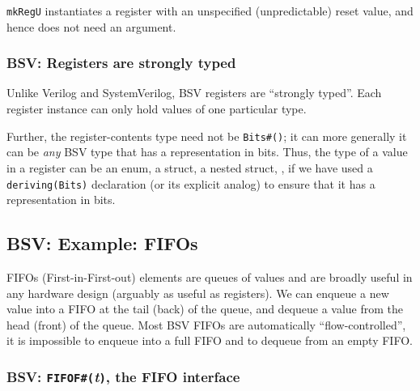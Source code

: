 \verb|mkRegU| instantiates a register with an unspecified
(unpredictable) reset value, and hence does not need an argument.


\subsubsection{BSV: Registers are strongly typed}


Unlike Verilog and SystemVerilog, BSV registers are ``strongly
typed''.  Each register instance can only hold values of one
particular type.

Further, the register-contents type need not be \verb|Bits#()|; it can
more generally it can be \emph{any} BSV type that has a representation
in bits.  Thus, the type of a value in a register can be an enum, a
struct, a nested struct, {\etc}, if we have used a
\verb|deriving(Bits)| declaration (or its explicit analog) to ensure
that it has a representation in bits.


\subsection{BSV: Example: FIFOs}


FIFOs (First-in-First-out) elements are queues of values and are
broadly useful in any hardware design (arguably as useful as
registers).  We can enqueue a new value into a FIFO at the tail (back)
of the queue, and dequeue a value from the head (front) of the queue.
Most BSV FIFOs are automatically ``flow-controlled'', {\ie} it is
impossible to enqueue into a full FIFO and to dequeue from an empty
FIFO.


\subsubsection{BSV: {\tt FIFOF\#(}\emph{t}{\tt )}, the FIFO interface}

\label{Sec_Magritte_Fetch_Decode_FIFOF_interface}


